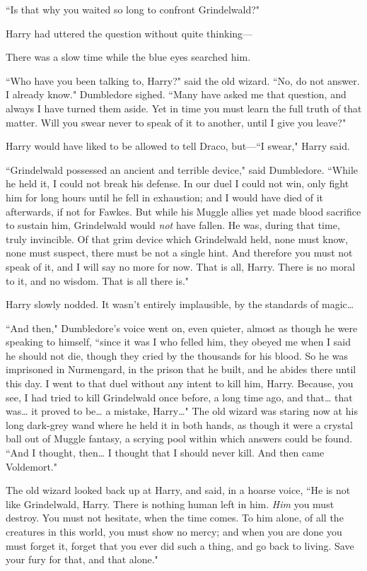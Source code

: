 ``Is that why you waited so long to confront Grindelwald?"

Harry had uttered the question without quite thinking---

There was a slow time while the blue eyes searched him.

``Who have you been talking to, Harry?" said the old wizard. ``No, do not answer. I already know." Dumbledore sighed. ``Many have asked me that question, and always I have turned them aside. Yet in time you must learn the full truth of that matter. Will you swear never to speak of it to another, until I give you leave?"

Harry would have liked to be allowed to tell Draco, but---``I swear," Harry said.

``Grindelwald possessed an ancient and terrible device," said Dumbledore. ``While he held it, I could not break his defense. In our duel I could not win, only fight him for long hours until he fell in exhaustion; and I would have died of it afterwards, if not for Fawkes. But while his Muggle allies yet made blood sacrifice to sustain him, Grindelwald would \emph{not} have fallen. He was, during that time, truly invincible. Of that grim device which Grindelwald held, none must know, none must suspect, there must be not a single hint. And therefore you must not speak of it, and I will say no more for now. That is all, Harry. There is no moral to it, and no wisdom. That is all there is."

Harry slowly nodded. It wasn't entirely implausible, by the standards of magic{\ldots}

``And then," Dumbledore's voice went on, even quieter, almost as though he were speaking to himself, ``since it was I who felled him, they obeyed me when I said he should not die, though they cried by the thousands for his blood. So he was imprisoned in Nurmengard, in the prison that he built, and he abides there until this day. I went to that duel without any intent to kill him, Harry. Because, you see, I had tried to kill Grindelwald once before, a long time ago, and that{\ldots} that was{\ldots} it proved to be{\ldots} a mistake, Harry{\ldots}" The old wizard was staring now at his long dark-grey wand where he held it in both hands, as though it were a crystal ball out of Muggle fantasy, a scrying pool within which answers could be found. ``And I thought, then{\ldots} I thought that I should never kill. And then came Voldemort."

The old wizard looked back up at Harry, and said, in a hoarse voice, ``He is not like Grindelwald, Harry. There is nothing human left in him. \emph{Him} you must destroy. You must not hesitate, when the time comes. To him alone, of all the creatures in this world, you must show no mercy; and when you are done you must forget it, forget that you ever did such a thing, and go back to living. Save your fury for that, and that alone."

